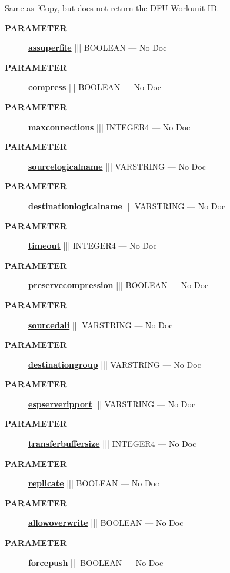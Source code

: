 \par





Same as fCopy, but does not return the DFU Workunit ID.






\par
\begin{description}
\item [\colorbox{tagtype}{\color{white} \textbf{\textsf{PARAMETER}}}] \textbf{\underline{assuperfile}} ||| BOOLEAN --- No Doc
\item [\colorbox{tagtype}{\color{white} \textbf{\textsf{PARAMETER}}}] \textbf{\underline{compress}} ||| BOOLEAN --- No Doc
\item [\colorbox{tagtype}{\color{white} \textbf{\textsf{PARAMETER}}}] \textbf{\underline{maxconnections}} ||| INTEGER4 --- No Doc
\item [\colorbox{tagtype}{\color{white} \textbf{\textsf{PARAMETER}}}] \textbf{\underline{sourcelogicalname}} ||| VARSTRING --- No Doc
\item [\colorbox{tagtype}{\color{white} \textbf{\textsf{PARAMETER}}}] \textbf{\underline{destinationlogicalname}} ||| VARSTRING --- No Doc
\item [\colorbox{tagtype}{\color{white} \textbf{\textsf{PARAMETER}}}] \textbf{\underline{timeout}} ||| INTEGER4 --- No Doc
\item [\colorbox{tagtype}{\color{white} \textbf{\textsf{PARAMETER}}}] \textbf{\underline{preservecompression}} ||| BOOLEAN --- No Doc
\item [\colorbox{tagtype}{\color{white} \textbf{\textsf{PARAMETER}}}] \textbf{\underline{sourcedali}} ||| VARSTRING --- No Doc
\item [\colorbox{tagtype}{\color{white} \textbf{\textsf{PARAMETER}}}] \textbf{\underline{destinationgroup}} ||| VARSTRING --- No Doc
\item [\colorbox{tagtype}{\color{white} \textbf{\textsf{PARAMETER}}}] \textbf{\underline{espserveripport}} ||| VARSTRING --- No Doc
\item [\colorbox{tagtype}{\color{white} \textbf{\textsf{PARAMETER}}}] \textbf{\underline{transferbuffersize}} ||| INTEGER4 --- No Doc
\item [\colorbox{tagtype}{\color{white} \textbf{\textsf{PARAMETER}}}] \textbf{\underline{replicate}} ||| BOOLEAN --- No Doc
\item [\colorbox{tagtype}{\color{white} \textbf{\textsf{PARAMETER}}}] \textbf{\underline{allowoverwrite}} ||| BOOLEAN --- No Doc
\item [\colorbox{tagtype}{\color{white} \textbf{\textsf{PARAMETER}}}] \textbf{\underline{forcepush}} ||| BOOLEAN --- No Doc
\end{description}







